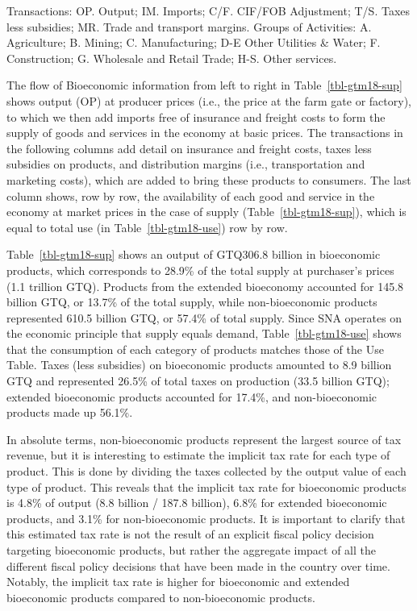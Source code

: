 \documentclass[
  letterpaper,
  DIV=11,
  numbers=noendperiod]{scrartcl}
\begin{document}
Transactions: OP. Output; IM. Imports; C/F. CIF/FOB Adjustment; T/S.
Taxes less subsidies; MR. Trade and transport margins. Groups of
Activities: A. Agriculture; B. Mining; C. Manufacturing; D-E Other
Utilities \& Water; F. Construction; G. Wholesale and Retail Trade; H-S.
Other services.

The flow of Bioeconomic information from left to right in
Table~\ref{tbl-gtm18-sup} shows output (OP) at producer prices (i.e.,
the price at the farm gate or factory), to which we then add imports
free of insurance and freight costs to form the supply of goods and
services in the economy at basic prices. The transactions in the
following columns add detail on insurance and freight costs, taxes less
subsidies on products, and distribution margins (i.e., transportation
and marketing costs), which are added to bring these products to
consumers. The last column shows, row by row, the availability of each
good and service in the economy at market prices in the case of supply
(Table~\ref{tbl-gtm18-sup}), which is equal to total use (in
Table~\ref{tbl-gtm18-use}) row by row.

Table~\ref{tbl-gtm18-sup} shows an output of GTQ306.8 billion in
bioeconomic products, which corresponds to 28.9\% of the total supply at
purchaser's prices (1.1 trillion GTQ). Products from the extended
bioeconomy accounted for 145.8 billion GTQ, or 13.7\% of the total
supply, while non-bioeconomic products represented 610.5 billion GTQ, or
57.4\% of total supply. Since SNA operates on the economic principle
that supply equals demand, Table~\ref{tbl-gtm18-use} shows that the
consumption of each category of products matches those of the Use Table.
Taxes (less subsidies) on bioeconomic products amounted to 8.9 billion
GTQ and represented 26.5\% of total taxes on production (33.5 billion
GTQ); extended bioeconomic products accounted for 17.4\%, and
non-bioeconomic products made up 56.1\%.

In absolute terms, non-bioeconomic products represent the largest source
of tax revenue, but it is interesting to estimate the implicit tax rate
for each type of product. This is done by dividing the taxes collected
by the output value of each type of product. This reveals that the
implicit tax rate for bioeconomic products is 4.8\% of output (8.8
billion / 187.8 billion), 6.8\% for extended bioeconomic products, and
3.1\% for non-bioeconomic products. It is important to clarify that this
estimated tax rate is not the result of an explicit fiscal policy
decision targeting bioeconomic products, but rather the aggregate impact
of all the different fiscal policy decisions that have been made in the
country over time. Notably, the implicit tax rate is higher for
bioeconomic and extended bioeconomic products compared to
non-bioeconomic products.
\end{document}
